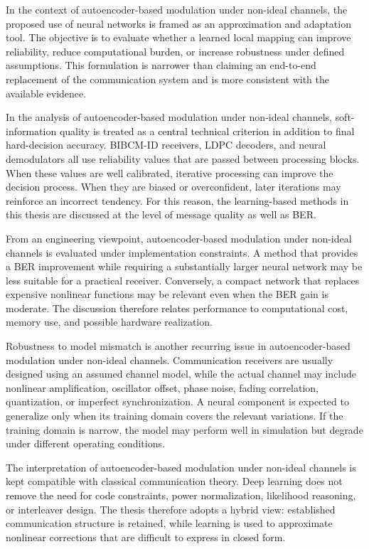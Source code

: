 In the context of autoencoder-based modulation under non-ideal channels, the proposed use of neural networks is framed as an approximation and adaptation tool. The objective is to evaluate whether a learned local mapping can improve reliability, reduce computational burden, or increase robustness under defined assumptions. This formulation is narrower than claiming an end-to-end replacement of the communication system and is more consistent with the available evidence.

In the analysis of autoencoder-based modulation under non-ideal channels, soft-information quality is treated as a central technical criterion in addition to final hard-decision accuracy. BIBCM-ID receivers, LDPC decoders, and neural demodulators all use reliability values that are passed between processing blocks. When these values are well calibrated, iterative processing can improve the decision process. When they are biased or overconfident, later iterations may reinforce an incorrect tendency. For this reason, the learning-based methods in this thesis are discussed at the level of message quality as well as BER.

From an engineering viewpoint, autoencoder-based modulation under non-ideal channels is evaluated under implementation constraints. A method that provides a BER improvement while requiring a substantially larger neural network may be less suitable for a practical receiver. Conversely, a compact network that replaces expensive nonlinear functions may be relevant even when the BER gain is moderate. The discussion therefore relates performance to computational cost, memory use, and possible hardware realization.

Robustness to model mismatch is another recurring issue in autoencoder-based modulation under non-ideal channels. Communication receivers are usually designed using an assumed channel model, while the actual channel may include nonlinear amplification, oscillator offset, phase noise, fading correlation, quantization, or imperfect synchronization. A neural component is expected to generalize only when its training domain covers the relevant variations. If the training domain is narrow, the model may perform well in simulation but degrade under different operating conditions.

The interpretation of autoencoder-based modulation under non-ideal channels is kept compatible with classical communication theory. Deep learning does not remove the need for code constraints, power normalization, likelihood reasoning, or interleaver design. The thesis therefore adopts a hybrid view: established communication structure is retained, while learning is used to approximate nonlinear corrections that are difficult to express in closed form.

